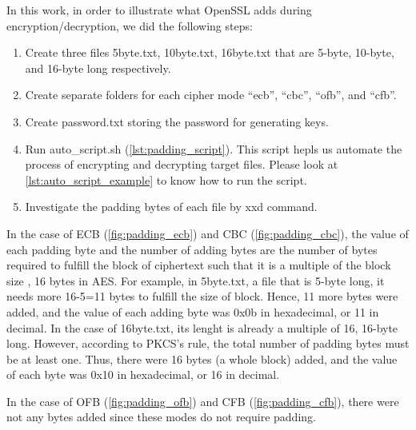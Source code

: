 In this work, in order to illustrate what OpenSSL adds during encryption/decryption, we
did the following steps:
\begin{enumerate}
    \item Create three files {\selectfont 5byte.txt, 10byte.txt,
    16byte.txt} that are 5-byte, 10-byte, and 16-byte long respectively.
    \item Create separate folders for each cipher mode ``ecb'', ``cbc'', ``ofb'',
    and ``cfb''.
    \item Create {\selectfont password.txt} storing the password
    for generating keys.
    \item Run {\selectfont auto\_script.sh} (\autoref{lst:padding_script}).
    This script hepls us automate the process of encrypting and decrypting target files.
    Please look at \autoref{lst:auto_script_example} to know how to run the script.
    \item Investigate the padding bytes of each file by {
    \selectfont xxd} command.
\end{enumerate}

In the case of ECB (\autoref{fig:padding_ecb}) and CBC (\autoref{fig:padding_cbc}),
the value of each padding byte and the number of adding bytes are the number of bytes
required to fulfill the block of ciphertext such that it is a multiple of the block size
, 16 bytes in AES. For example, in {\selectfont 5byte.txt}, a file that
is 5-byte long, it needs more 16-5=11 bytes to fulfill the size of block. Hence, 11 more
bytes were added, and the value of each adding byte was 0x0b in hexadecimal, or 11 in decimal.
In the case of {\selectfont 16byte.txt}, its lenght is already a multiple
of 16, 16-byte long. However, according to PKCS's rule, the total number of padding bytes
must be at least one. Thus, there were 16 bytes (a whole block) added, and the value of
each byte was 0x10 in hexadecimal, or 16 in decimal.

In the case of OFB (\autoref{fig:padding_ofb}) and CFB (\autoref{fig:padding_cfb}), there
were not any bytes added since these modes do not require padding.


